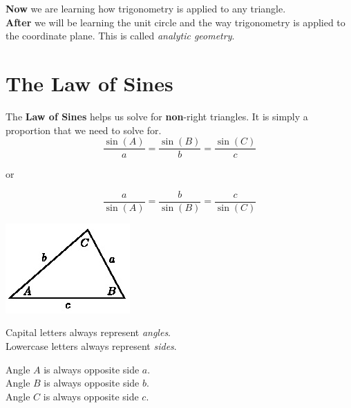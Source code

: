 \documentclass[12pt]{article}
\begin{document}
\textbf{Now} we are learning how trigonometry is applied to any triangle.\\

\textbf{After} we will be learning the unit circle and the way trigonometry is applied to the coordinate plane. This is called \textit{analytic geometry}.\\

\let\stdsection\section
\renewcommand\section{\newpage\stdsection}

\section*{The Law of Sines}

The \textbf{Law of Sines} helps us solve for \textbf{non}-right triangles. It is simply a proportion that we need to solve for.\\

$$\frac{\sin(A)}{a}=\frac{\sin(B)}{b}=\frac{\sin(C)}{c}$$

or 

$$\frac{a}{\sin(A)}=\frac{b}{\sin(B)}=\frac{c}{\sin(C)}$$

\begin{center}
\includegraphics[scale=1]{triangle01.jpg}
\end{center}


\begin{multicols}{2}
Capital letters always represent \textit{angles}. \\
Lowercase letters always represent \textit{sides}.\\

\columnbreak

Angle $A$ is always opposite side $a$.\\
Angle $B$ is always opposite side $b$.\\
Angle $C$ is always opposite side $c$.\\

\end{multicols}
\end{document}
